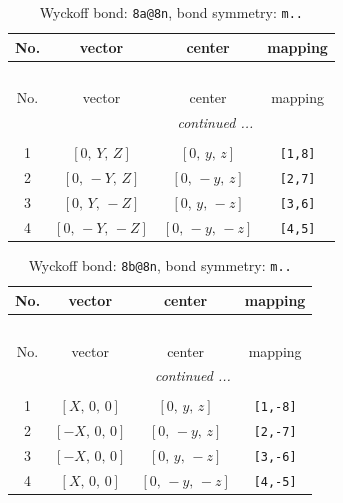 \documentclass[fleqn,8pt]{jsarticle}
\begin{document}
\begin{longtable}{cccc}
\caption{Wyckoff bond: {\tt 8a@8n}, bond symmetry: {\tt m..}}
 \\
 \hline \hline
No. & vector & center & mapping \\ \hline \endfirsthead

\multicolumn{3}{l}{\tablename\ \thetable{}} \\
 \hline \hline
No. & vector & center & mapping \\ \hline \endhead

 \hline \hline
\multicolumn{3}{r}{\footnotesize\it continued ...} \\ \endfoot

 \hline \hline
\multicolumn{3}{r}{} \\ \endlastfoot

1 & $\left[ 0,\, Y,\, Z \right]$ & $\left[ 0,\, y,\, z \right]$ & {\tt [1,8]} \\ \hline
2 & $\left[ 0,\, - Y,\, Z \right]$ & $\left[ 0,\, - y,\, z \right]$ & {\tt [2,7]} \\ \hline
3 & $\left[ 0,\, Y,\, - Z \right]$ & $\left[ 0,\, y,\, - z \right]$ & {\tt [3,6]} \\ \hline
4 & $\left[ 0,\, - Y,\, - Z \right]$ & $\left[ 0,\, - y,\, - z \right]$ & {\tt [4,5]} \\
\end{longtable}
\renewcommand{\arraystretch}{1.2}
\begin{longtable}{cccc}
\caption{Wyckoff bond: {\tt 8b@8n}, bond symmetry: {\tt m..}}
 \\
 \hline \hline
No. & vector & center & mapping \\ \hline \endfirsthead

\multicolumn{3}{l}{\tablename\ \thetable{}} \\
 \hline \hline
No. & vector & center & mapping \\ \hline \endhead

 \hline \hline
\multicolumn{3}{r}{\footnotesize\it continued ...} \\ \endfoot

 \hline \hline
\multicolumn{3}{r}{} \\ \endlastfoot

1 & $\left[ X,\, 0,\, 0 \right]$ & $\left[ 0,\, y,\, z \right]$ & {\tt [1,-8]} \\ \hline
2 & $\left[ - X,\, 0,\, 0 \right]$ & $\left[ 0,\, - y,\, z \right]$ & {\tt [2,-7]} \\ \hline
3 & $\left[ - X,\, 0,\, 0 \right]$ & $\left[ 0,\, y,\, - z \right]$ & {\tt [3,-6]} \\ \hline
4 & $\left[ X,\, 0,\, 0 \right]$ & $\left[ 0,\, - y,\, - z \right]$ & {\tt [4,-5]} \\
\end{longtable}
\end{document}
